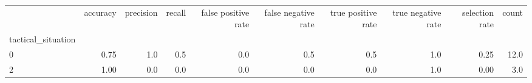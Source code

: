 \begin{tabular}{lrrrrrrrrr}
\toprule
{} &  accuracy &  precision &  recall &  false positive rate &  false negative rate &  true positive rate &  true negative rate &  selection rate &  count \\
tactical\_situation &           &            &         &                      &                      &                     &                     &                 &        \\
\midrule
0                  &      0.75 &        1.0 &     0.5 &                  0.0 &                  0.5 &                 0.5 &                 1.0 &            0.25 &   12.0 \\
2                  &      1.00 &        0.0 &     0.0 &                  0.0 &                  0.0 &                 0.0 &                 1.0 &            0.00 &    3.0 \\
\bottomrule
\end{tabular}
